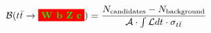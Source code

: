\documentclass{article}
\begin{document}
\begin{displaymath}
{\mathcal B}(t\bar{t} \rightarrow \colorbox{red}{\bf \color[rgb]{0,1,0} W b Z c}) = 
\frac{ N_\mathrm{candidates} - N_\mathrm{background} }
{{\mathcal A} \cdot \int {\mathcal L} dt \cdot \sigma_{t \bar{t}}}
\end{displaymath}
\end{document}
